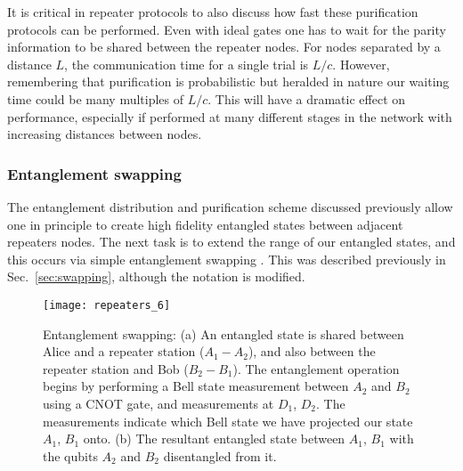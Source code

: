 It is critical in repeater protocols to also discuss how fast these purification protocols can be performed. Even with ideal gates one has to wait for the parity information to be shared between the repeater nodes. For nodes separated by a distance $L$, the communication time for a single trial is $L/c$. However, remembering that purification is probabilistic but heralded in nature our waiting time could be many multiples of $L/c$. This will have a dramatic effect on performance, especially if performed at many different stages in the network with increasing distances between nodes.

\subsubsection{Entanglement swapping}\label{sec:reps_ent_swap}

The entanglement distribution and purification scheme discussed previously allow one in principle to create high fidelity entangled states between adjacent repeaters nodes. The next task is to extend the range of our entangled states, and this occurs via simple entanglement swapping \cite{bib:BDCZ98, bib:Zukowski93, bib:goebel08, bib:Duan01}. This was described previously in Sec.~\ref{sec:swapping}, although the notation is modified.

\begin{figure}[!htbp]
\texttt{[image: repeaters\_6]}
\captionspacefig \caption{Entanglement swapping: (a) An entangled state is shared between Alice and a repeater station ($A_1-A_2$), and also between the repeater station and Bob ($B_2-B_1$). The entanglement operation begins by performing a Bell state measurement between $A_2$ and $B_2$ using a CNOT gate, and measurements at $D_1$, $D_2$.  The measurements indicate which Bell state we have projected our state $A_1$, $B_1$ onto. (b) The resultant entangled state between $A_1$, $B_1$ with the qubits $A_2$ and $B_2$ disentangled from it.}
\label{fig:repeaters_6}
\end{figure} 

